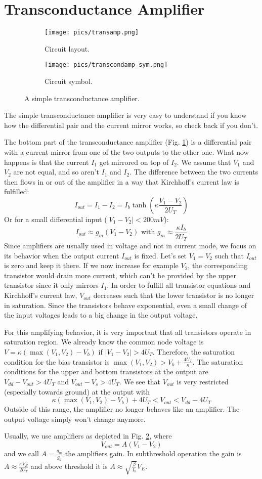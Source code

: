 \documentclass[report]{subfiles}
\begin{document}
\section{Transconductance Amplifier}
\begin{figure}[b]
\begin{subfigure} [b]{0.45\textwidth}
  \centering
  \texttt{[image: pics/transamp.png]}
  \caption{Circuit layout. \cite{lec4}}
  \label{fig:transamp}
\end{subfigure}
	\begin{subfigure} [b]{0.45\textwidth}
	\centering
	\texttt{[image: pics/transcondamp\_sym.png]}
	\caption{Circuit symbol. \cite{lec5}}
	\label{fig:transamp_sym}
	\end{subfigure}
	\label{fig:transamp_all}
	\caption{A simple transconductance amplifier.}
\end{figure}\bigskip

The simple transconductance amplifier is very easy to understand if you know how the differential pair and the current mirror works, so check back if you don't. 

The bottom part of the transconductance amplifier (Fig. \ref{fig:transamp}) is a differential pair with a current mirror from one of the two outputs to the other one. What now happens is that the current $I_1$ get mirrored on top of $I_2$. We assume that $V_1$ and $V_2$ are not equal, and so aren't $I_1$ and $I_2$. The difference between the two currents then flows in or out of the amplifier in a way that Kirchhoff's current law is fulfilled:
$$I_{out} = I_1 - I_2 = I_b \tanh\left(\kappa \frac{V_1-V_2}{2U_T}\right)$$
Or for a small differential input ($|V_1-V_2| < 200 mV$):
$$ I_{out} \approx g_m \left(V_1-V_2\right) \text{  with  } g_m \approx \frac{\kappa I_b}{2U_T}$$
Since amplifiers are usually used in voltage and not in current mode, we focus on its behavior when the output current $I_{out}$ is fixed. Let's set $V_1 = V_2$ such that $I_{out}$ is zero and keep it there. If we now increase for example $V_2$, the corresponding transistor would drain more current, which can't be provided by the upper transistor since it only mirrors $I_1$. In order to fulfill all transistor equations and Kirchhoff's current law, $V_{out}$ decreases such that the lower transistor is no longer in saturation. Since the transistors behave exponential, even a small change of the input voltages leads to a big change in the output voltage.
\par For this amplifying behavior, it is very important that all transistors operate in saturation region. We already know the common node voltage is 
$ V = \kappa \left(\max \left(V_1, V_2\right)-V_b \right)$ if $|V_1 - V_2| > 4U_T$. Therefore, the saturation condition for the bias transistor is
$\max \left(V_1, V_2\right) > V_b + \frac{4U_T}{\kappa}$. The saturation conditions for the upper and bottom transistors at the output are
$  V_{dd} - V_{out} > 4U_T$ and $V_{out} -V_s > 4U_T$. We see that $V_{out}$ is very restricted (especially towards ground) at the output with
$$\kappa\left(\max \left(V_1, V_2\right)- V_b\right) + 4U_T < V_{out} < V_{dd}-4U_T$$
Outside of this range, the amplifier no longer behaves like an amplifier. The output voltage simply won't change anymore.

Usually, we use amplifiers as depicted in Fig. \ref{fig:transamp_sym}, where 
$$V_{out}=A (V_1 -V_2)$$ 
and we call $A = \frac{g_m}{g_d}$ the amplifiers gain. In subthreshold operation the gain is $A \approx \frac{\kappa V_E}{2U_T}$ and above threshold it is $A \approx \sqrt{\frac{\beta}{I_b}}V_E$.
\end{document}
